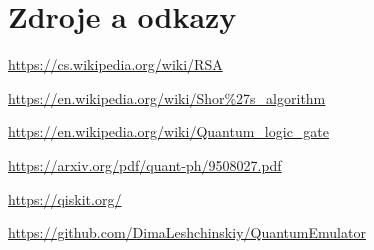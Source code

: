 \documentclass[11pt]{article}
\begin{document}
\newpage

\section{Zdroje a odkazy}
\color{blue}
\fontsize{10pt}{0}
\url{https://cs.wikipedia.org/wiki/RSA}
\par\url{https://en.wikipedia.org/wiki/Shor%27s_algorithm}
\par\url{https://en.wikipedia.org/wiki/Quantum_logic_gate}
\par\url{https://arxiv.org/pdf/quant-ph/9508027.pdf}
\par\url{https://qiskit.org/}
\par\url{https://github.com/DimaLeshchinskiy/QuantumEmulator}
\end{document}
